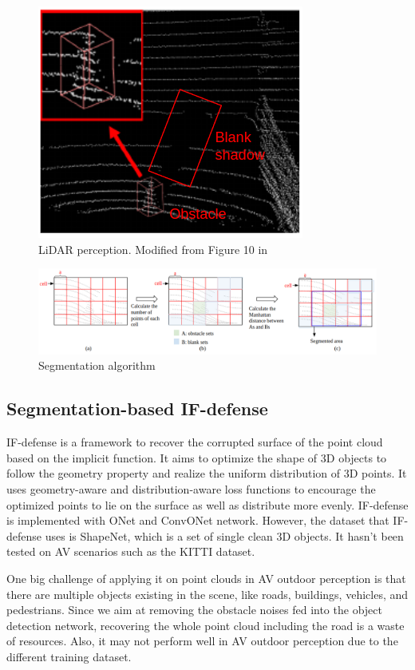 \begin{figure}
	\centering
	\includegraphics[width=0.5\linewidth]{figure/lidar.png}
	\caption{LiDAR perception. Modified from Figure 10 in \cite{msf-adv}}
	\label{fig:lidar}
\end{figure}

\begin{figure}
	\centering
	\includegraphics[width=1\linewidth]{figure/segmentation.png}
	\caption{Segmentation algorithm}
	\label{fig:seg}
\end{figure}



\subsection{Segmentation-based IF-defense} 
IF-defense\cite{if-defense} is a framework to recover the corrupted surface of the point cloud based on the implicit function\cite{implicit}.
It aims to optimize the shape of 3D objects to follow the geometry property and realize the uniform distribution of 3D points.
It uses geometry-aware and distribution-aware loss functions to encourage the optimized points to lie on the surface as well as distribute more evenly.
IF-defense\cite{if-defense} is implemented with ONet\cite{ONet} and ConvONet\cite{ConvONet} network.
However, the dataset that IF-defense\cite{if-defense} uses is ShapeNet\cite{shapenet}, which is a set of single clean 3D objects.
It hasn't been tested on AV scenarios such as the KITTI\cite{kitti} dataset. 

One big challenge of applying it on point clouds in AV outdoor perception is that there are multiple objects existing in the scene, like roads, buildings, vehicles, and pedestrians.
Since we aim at removing the obstacle noises fed into the object detection network, recovering the whole point cloud including the road is a waste of resources.
Also, it may not perform well in AV outdoor perception due to the different training dataset.

